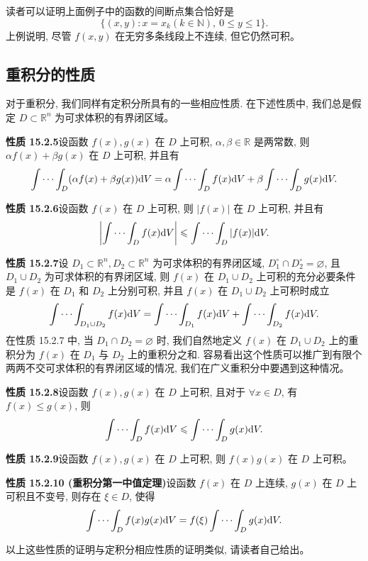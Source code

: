 \documentclass[UTF8, 12pt, fontset=fandol, oneside]{ctexart}
\begin{document}
读者可以证明上面例子中的函数的间断点集合恰好是
\[
  \{(x,y):x=x_k(k\in\mathbb N),\ 0\leqslant y\leqslant1\}.
\]
上例说明, 尽管 $f(x,y)$ 在无穷多条线段上不连续, 但它仍然可积。

\subsection{重积分的性质}

对于重积分, 我们同样有定积分所具有的一些相应性质. 在下述性质中, 我们总是假定 $D\subset\mathbb R^n$ 为可求体积的有界闭区域。

\noindent\textbf{性质 15.2.5}\quad 设函数 $f(x),g(x)$ 在 $D$ 上可积, $\alpha,\beta\in\mathbb R$ 是两常数, 则 $\alpha f(x)+\beta g(x)$ 在 $D$ 上可积, 并且有
\[
  \idotsint_D(\alpha f(x)+\beta g(x))\mathrm dV
  =\alpha\idotsint_D f(x)\mathrm dV+\beta\idotsint_D g(x)\mathrm dV.
\]

\noindent\textbf{性质 15.2.6}\quad 设函数 $f(x)$ 在 $D$ 上可积, 则 $|f(x)|$ 在 $D$ 上可积, 并且有
\[
  \left|\idotsint_D f(x)\mathrm dV\right|
  \leqslant \idotsint_D |f(x)|\mathrm dV.
\]

\noindent\textbf{性质 15.2.7}\quad 设 $D_1\subset\mathbb R^n,D_2\subset\mathbb R^n$ 为可求体积的有界闭区域, $D_1^\circ\cap D_2^\circ=\varnothing$, 且 $D_1\cup D_2$ 为可求体积的有界闭区域, 则 $f(x)$ 在 $D_1\cup D_2$ 上可积的充分必要条件是 $f(x)$ 在 $D_1$ 和 $D_2$ 上分别可积, 并且 $f(x)$ 在 $D_1\cup D_2$ 上可积时成立
\[
  \idotsint_{D_1\cup D_2}f(x)\mathrm dV
  =\idotsint_{D_1}f(x)\mathrm dV+\idotsint_{D_2}f(x)\mathrm dV.
\]
在性质 15.2.7 中, 当 $D_1\cap D_2=\varnothing$ 时, 我们自然地定义 $f(x)$ 在 $D_1\cup D_2$ 上的重积分为 $f(x)$ 在 $D_1$ 与 $D_2$ 上的重积分之和. 容易看出这个性质可以推广到有限个两两不交可求体积的有界闭区域的情况, 我们在广义重积分中要遇到这种情况。

\noindent\textbf{性质 15.2.8}\quad 设函数 $f(x),g(x)$ 在 $D$ 上可积, 且对于 $\forall x\in D$, 有 $f(x)\leqslant g(x)$, 则
\[
  \idotsint_D f(x)\mathrm dV\leqslant\idotsint_D g(x)\mathrm dV.
\]

\noindent\textbf{性质 15.2.9}\quad 设函数 $f(x),g(x)$ 在 $D$ 上可积, 则 $f(x)g(x)$ 在 $D$ 上可积。

\noindent\textbf{性质 15.2.10 (重积分第一中值定理)}\quad 设函数 $f(x)$ 在 $D$ 上连续, $g(x)$ 在 $D$ 上可积且不变号, 则存在 $\xi\in D$, 使得
\[
  \idotsint_D f(x)g(x)\mathrm dV=f(\xi)\idotsint_D g(x)\mathrm dV.
\]

以上这些性质的证明与定积分相应性质的证明类似, 请读者自己给出。
\end{document}
